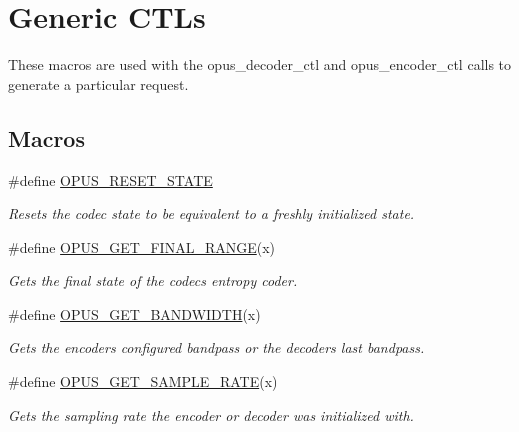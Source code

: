 \hypertarget{group__opus__genericctls}{}\section{Generic C\+T\+Ls}
\label{group__opus__genericctls}


These macros are used with the {\ttfamily opus\+\_\+decoder\+\_\+ctl} and {\ttfamily opus\+\_\+encoder\+\_\+ctl} calls to generate a particular request.  


\subsection*{Macros}
\begin{DoxyCompactItemize}
\item 
\#define \hyperlink{group__opus__genericctls_gadc74e4fa8bcdf9994187d52d92207337}{O\+P\+U\+S\+\_\+\+R\+E\+S\+E\+T\+\_\+\+S\+T\+A\+TE}
\begin{DoxyCompactList}\small\item\em Resets the codec state to be equivalent to a freshly initialized state. \end{DoxyCompactList}\item 
\#define \hyperlink{group__opus__genericctls_ga1108a508aa475f964d247c1b04d26d89}{O\+P\+U\+S\+\_\+\+G\+E\+T\+\_\+\+F\+I\+N\+A\+L\+\_\+\+R\+A\+N\+GE}(x)
\begin{DoxyCompactList}\small\item\em Gets the final state of the codec\textquotesingle{}s entropy coder. \end{DoxyCompactList}\item 
\#define \hyperlink{group__opus__genericctls_ga29db1d9b5e670debec54d1163ad2ec62}{O\+P\+U\+S\+\_\+\+G\+E\+T\+\_\+\+B\+A\+N\+D\+W\+I\+D\+TH}(x)
\begin{DoxyCompactList}\small\item\em Gets the encoder\textquotesingle{}s configured bandpass or the decoder\textquotesingle{}s last bandpass. \end{DoxyCompactList}\item 
\#define \hyperlink{group__opus__genericctls_gac8ad425424211faae6a0fbfb7c28bb51}{O\+P\+U\+S\+\_\+\+G\+E\+T\+\_\+\+S\+A\+M\+P\+L\+E\+\_\+\+R\+A\+TE}(x)
\begin{DoxyCompactList}\small\item\em Gets the sampling rate the encoder or decoder was initialized with. \end{DoxyCompactList}\end{DoxyCompactItemize}


